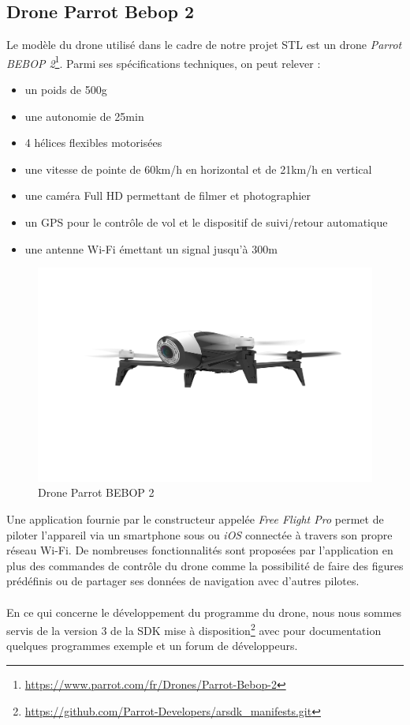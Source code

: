 \subsection{Drone Parrot Bebop 2}

Le modèle du drone utilisé dans le cadre de notre projet STL est un drone \textit{Parrot BEBOP 2}\footnote{\url{https://www.parrot.com/fr/Drones/Parrot-Bebop-2}}. Parmi ses spécifications techniques, on peut relever :
\begin{itemize}
\item un poids de 500g
\item une autonomie de 25min
\item 4 hélices flexibles motorisées
\item une vitesse de pointe de 60km/h en horizontal et de 21km/h en vertical
\item une caméra Full HD permettant de filmer et photographier
\item un GPS pour le contrôle de vol et le dispositif de suivi/retour automatique
\item une antenne  Wi-Fi émettant un signal jusqu'à 300m
\end{itemize}

\newpage
\begin{figure}
\begin{center}
\includegraphics[scale=0.05]{images/drone.jpg}
\caption{Drone Parrot BEBOP 2}
\end{center}
\end{figure}

Une application fournie par le constructeur appelée \textit{Free Flight Pro} permet de piloter l'appareil via un smartphone sous \android ou \textit{iOS} connectée à travers son propre réseau Wi-Fi. De nombreuses fonctionnalités sont proposées par l'application en plus des commandes de contrôle du drone comme la possibilité de faire des figures prédéfinis ou de partager ses données de navigation avec d'autres pilotes.

\paragraph{}
En ce qui concerne le développement du programme du drone, nous nous sommes servis de la version 3 de la SDK mise à disposition\footnote{\url{https://github.com/Parrot-Developers/arsdk_manifests.git}} avec pour documentation quelques programmes exemple et un forum de développeurs.